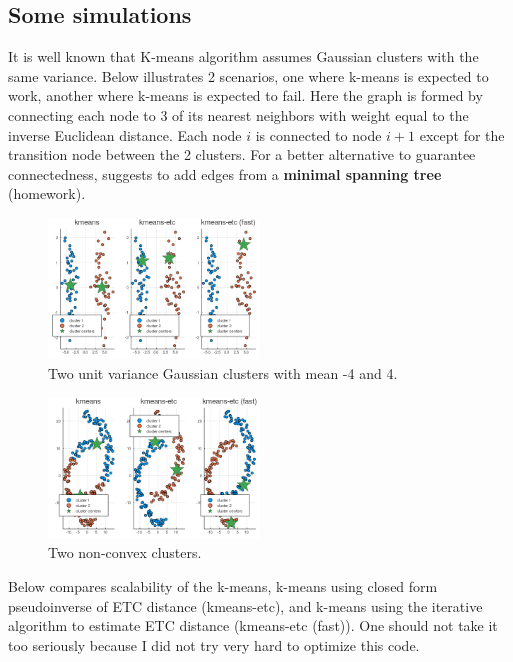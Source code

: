 \documentclass[./some_latex_template.tex]{subfiles}
\begin{document}
\subsection{Some simulations}

It is well known that K-means algorithm assumes Gaussian clusters with the same variance. Below illustrates 2 scenarios, one where k-means is expected to work, another where k-means is expected to fail. Here the graph is formed by connecting each node to 3 of its nearest neighbors with weight equal to the inverse Euclidean distance. Each node $i$ is connected to node $i + 1$ except for the transition node between the 2 clusters. For a better alternative to guarantee connectedness, \cite{yen2005clustering} suggests to add edges from a \textbf{minimal spanning tree} (homework). 

\begin{figure}[H]
	\centering    
    \includegraphics[width=0.5\textwidth]{figures/convex.png}
    \caption{Two unit variance Gaussian clusters with mean -4 and 4.}
\end{figure}

\begin{figure}[H]
	\centering    
    \includegraphics[width=0.5\textwidth]{figures/nonconvex.png}
    \caption{Two non-convex clusters.}
\end{figure}

Below compares scalability of the k-means, k-means using closed form pseudoinverse of ETC distance (kmeans-etc), and k-means using the iterative algorithm to estimate ETC distance (kmeans-etc (fast)). One should not take it too seriously because I did not try very hard to optimize this code. 
\end{document}
